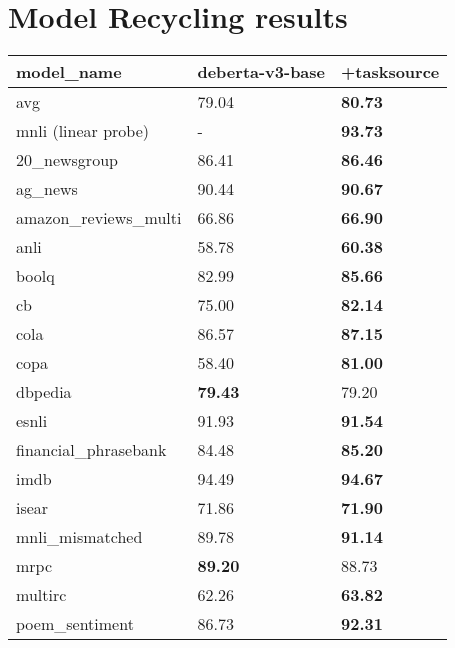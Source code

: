 \documentclass[11pt]{article}
\begin{document}
\section{Model Recycling results}
\begin{table}[H]
\centering
\begin{tabular}{@{}lll@{}}
\toprule
model\_name            & deberta-v3-base & +tasksource \\ \midrule
avg                    & 79.04           & \textbf{80.73}             \\
mnli (linear probe)               & -               & \textbf{93.73}             \\
20\_newsgroup          & 86.41           & \textbf{86.46}             \\
ag\_news               & 90.44           & \textbf{90.67}             \\
amazon\_reviews\_multi & 66.86           & \textbf{66.90}             \\
anli                   & 58.78           & \textbf{60.38}             \\
boolq                  & 82.99           & \textbf{85.66}             \\
cb                     & 75.00           & \textbf{82.14}             \\
cola                   & 86.57           & \textbf{87.15}             \\
copa                   & 58.40           & \textbf{81.00}             \\
dbpedia                & \textbf{79.43}  & 79.20                      \\
esnli                  & 91.93           & \textbf{91.54}             \\
financial\_phrasebank  & 84.48           & \textbf{85.20}             \\
imdb                   & 94.49           & \textbf{94.67}             \\
isear                  & 71.86           & \textbf{71.90}             \\
mnli\_mismatched       & 89.78           & \textbf{91.14}             \\
mrpc                   & \textbf{89.20}  & 88.73                      \\
multirc                & 62.26           & \textbf{63.82}             \\
poem\_sentiment        & 86.73           & \textbf{92.31}             \\

\end{tabular}
\end{table}
\end{document}
